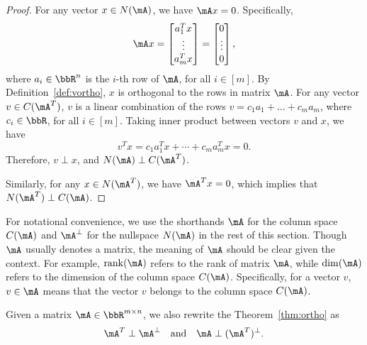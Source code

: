 \documentclass[11pt]{article}
\DeclareMathOperator{\rank}{rank}
\theoremstyle{plain}
\theoremstyle{definition}
\begin{document}
\begin{proof}
	For any vector $x \in N(\mA)$, we have $\mA x = 0$. Specifically,
	\begin{align}
		\mA x  = \begin{bmatrix}
			a_1^T x \\ \vdots \\ a_m^T x 
		\end{bmatrix} = \begin{bmatrix}
			0\\ \vdots \\0
		\end{bmatrix},
	\end{align}
	where $a_i \in \bbR^n$ is the $i$-th  row of $\mA$, for all $ i \in [m]$. By Definition~\ref{def:vortho}, $x$ is orthogonal to the rows in matrix $\mA$. For any vector $v \in C(\mA^T)$, $v$ is a linear combination of the rows $v = c_1 a_1 + ...+c_m a_m$, where $c_i \in \bbR$, for all $i\in [m]$. Taking inner product between vectors $v$ and $x$, we have
	\[  v^T x =  c_1 a_1^T x + \cdots + c_m a_m^T x = 0.  \]
	Therefore, $v \perp x$, and $N(\mA) \perp C(\mA^T)$.
	
	Similarly, for any $x \in N(\mA^T)$, we have $\mA^T x = 0$, which implies  that $N(\mA^T) \perp C(\mA)$. 
\end{proof}

For notational convenience, we use the shorthands $\mA$ for the column space $C(\mA)$ and $\mA^{\perp}$ for the nullspace $N(\mA)$ in the rest of this section. Though $\mA$ usually denotes a matrix, the meaning of $\mA$ should be clear given the context. For example, $\rank(\mA)$ refers to the rank of matrix $\mA$, while $\dim(\mA)$ refers to the dimension of the column space $C(\mA)$. Specifically, for a vector $v$, $v \in \mA$ means that the vector $v$ belongs to the column space $C(\mA)$.
 
\vspace{0.2cm}
Given a matrix $\mA \in \bbR^{m \times n}$, we also rewrite the Theorem~\ref{thm:ortho} as
\[ \mA^T \perp \mA^{\perp} \quad \text{and} \quad \mA \perp (\mA^{T})^{\perp}. \]
\end{document}
